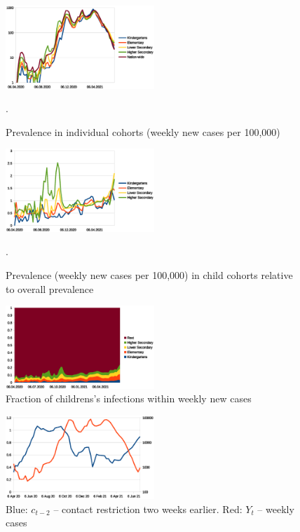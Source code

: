 \documentclass[fleqn,10pt]{wlscirep}
\begin{document}
\begin{figure}
    \centering
    \includegraphics[width=0.5\textwidth]{prevalence}
    \caption{Prevalence in individual cohorts (weekly new cases per 100,000)}.
    \label{fig:prevalence}
\end{figure}

\begin{figure}
    \centering
    \includegraphics[width=0.5\textwidth]{prevrel}
    \caption{Prevalence (weekly new cases per 100,000) in child cohorts relative to overall prevalence}.
    \label{fig:prevrel}
\end{figure}

\begin{figure}
    \centering
    \includegraphics[width=0.5\textwidth]{fractions}
    \caption{Fraction of childrens's infections within weekly new cases}
    \label{fig:fraction}
\end{figure}

\begin{figure}
    \centering
    \includegraphics[width=0.5\textwidth]{cy}
    \caption{Blue: $c_{t-2}$ -- contact restriction two weeks earlier.  Red: $Y_t$ -- weekly cases}
    \label{fig:restriction}
\end{figure}
\end{document}
